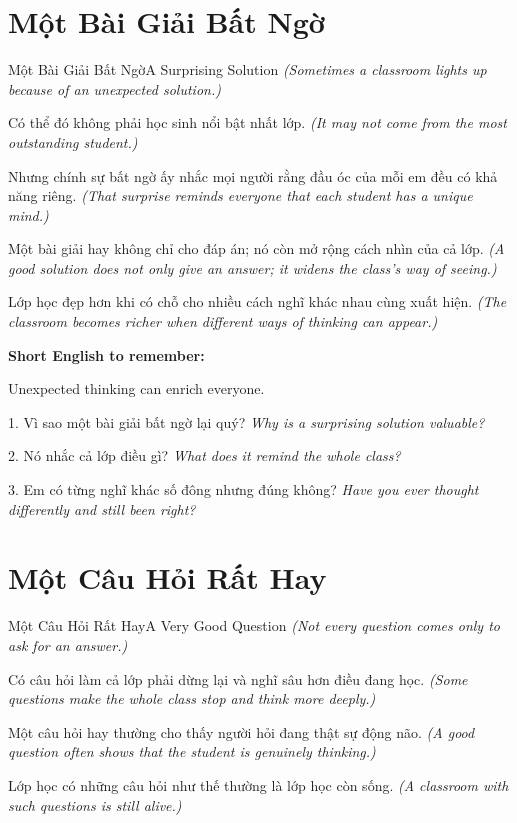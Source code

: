 \section{Một Bài Giải Bất Ngờ}
\begin{truyen}{Một Bài Giải Bất Ngờ}{A Surprising Solution}
\textit{(Sometimes a classroom lights up because of an unexpected solution.)}

Có thể đó không phải học sinh nổi bật nhất lớp.
\textit{(It may not come from the most outstanding student.)}

Nhưng chính sự bất ngờ ấy nhắc mọi người rằng đầu óc của mỗi em đều có khả năng riêng.
\textit{(That surprise reminds everyone that each student has a unique mind.)}

Một bài giải hay không chỉ cho đáp án; nó còn mở rộng cách nhìn của cả lớp.
\textit{(A good solution does not only give an answer; it widens the class's way of seeing.)}
\end{truyen}

\begin{baihoc}
Lớp học đẹp hơn khi có chỗ cho nhiều cách nghĩ khác nhau cùng xuất hiện.
\textit{(The classroom becomes richer when different ways of thinking can appear.)}
\end{baihoc}

\begin{ghinhoanh}
\textbf{Short English to remember:}

Unexpected thinking can enrich everyone.

\end{ghinhoanh}

\begin{tuhocnhanh}
1. Vì sao một bài giải bất ngờ lại quý? \textit{Why is a surprising solution valuable?}

2. Nó nhắc cả lớp điều gì? \textit{What does it remind the whole class?}

3. Em có từng nghĩ khác số đông nhưng đúng không? \textit{Have you ever thought differently and still been right?}
\end{tuhocnhanh}
\ngancach

\section{Một Câu Hỏi Rất Hay}
\begin{truyen}{Một Câu Hỏi Rất Hay}{A Very Good Question}
\textit{(Not every question comes only to ask for an answer.)}

Có câu hỏi làm cả lớp phải dừng lại và nghĩ sâu hơn điều đang học.
\textit{(Some questions make the whole class stop and think more deeply.)}

Một câu hỏi hay thường cho thấy người hỏi đang thật sự động não.
\textit{(A good question often shows that the student is genuinely thinking.)}

Lớp học có những câu hỏi như thế thường là lớp học còn sống.
\textit{(A classroom with such questions is still alive.)}
\end{truyen}

